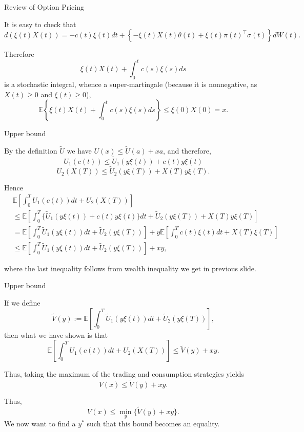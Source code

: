 \documentclass{beamer}
\begin{document}
\begin{frame}{Review of Option Pricing}

    {\footnotesize \footnotesize
     It is easy to check that
\[
d(\xi(t)X(t)) = -c(t)\xi(t)dt + \left\{ -\xi(t)X(t)\theta(t) + \xi(t)\pi(t)^\top\sigma(t) \right\}dW(t).
\]

 \pause Therefore
\[
\xi(t)X(t) + \int_0^t c(s)\xi(s)ds
\]
is a stochastic integral, whence a super-martingale (because it is nonnegative, as \( X(t) \geq 0 \) and \(\xi(t) \geq 0\)),
\[
\mathbb{E}\left\{\xi(t)X(t) + \int_0^t c(s)\xi(s)ds\right\} \leq \xi(0)X(0) = x.  
\]

    }
\end{frame}

\begin{frame}{Upper bound}

    {\footnotesize \footnotesize
     By the definition $\tilde{U}$ we have $U(x) \leq \tilde{U}(a) + xa$, and therefore,
\[
U_1(c(t)) \leq \tilde{U}_1(y\xi(t)) + c(t)y\xi(t)
\]
\[
U_2(X(T)) \leq \tilde{U}_2(y\xi(T)) + X(T)y\xi(T).
\]

 \pause Hence
\begin{align*}
    &\mathbb{E} \left[ \int_{0}^{T} U_1(c(t))dt + U_2(X(T)) \right]\\
&\leq \mathbb{E} \left[ \int_{0}^{T} \{ \tilde{U}_1(y\xi(t)) + c(t)y\xi(t) \} dt + \tilde{U}_2(y\xi(T)) + X(T)y\xi(T) \right]\\
&= \mathbb{E} \left[ \int_{0}^{T} \tilde{U}_1(y\xi(t))dt + \tilde{U}_2(y\xi(T)) \right] 
+ y\mathbb{E} \left[ \int_{0}^{T} c(t)\xi(t)dt + X(T)\xi(T) \right]\\
&\leq \mathbb{E} \left[ \int_{0}^{T} \tilde{U}_1(y\xi(t))dt + \tilde{U}_2(y\xi(T)) \right] + xy,
\end{align*}

where the last inequality follows from wealth inequality we get in previous slide.

    }
\end{frame}
\begin{frame}{Upper bound}

    {\footnotesize \footnotesize
     If we define
\[
\tilde{V}(y) := \mathbb{E} \left[ \int_{0}^{T} \tilde{U}_1(y\xi(t))dt + \tilde{U}_2(y\xi(T)) \right],
\]
then what we have shown is that
\[
\mathbb{E} \left[ \int_{0}^{T} U_1(c(t))dt + U_2(X(T)) \right] \leq \tilde{V}(y) + xy.
\]

 \pause Thus, taking the maximum of the trading and consumption strategies yields
\[
V(x) \leq \tilde{V}(y) + xy.
\]

Thus,
\[
V(x) \leq \min_{y} \{\tilde{V}(y) + xy\}. 
\]
We now want to find a $y^*$ such that this bound becomes an equality.
    }
\end{frame}
\end{document}
